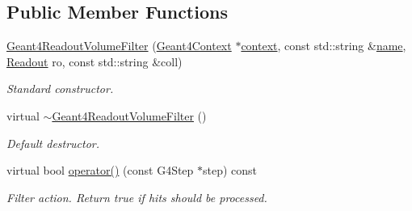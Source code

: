 \subsection*{Public Member Functions}
\begin{DoxyCompactItemize}
\item 
\hyperlink{class_d_d4hep_1_1_simulation_1_1_geant4_readout_volume_filter_a459197d17e4baedd3d1147e4def0aea9}{Geant4\+Readout\+Volume\+Filter} (\hyperlink{class_d_d4hep_1_1_simulation_1_1_geant4_context}{Geant4\+Context} $\ast$\hyperlink{class_d_d4hep_1_1_simulation_1_1_geant4_action_aa9d87f0ec2a72b7fc2591b18f98d75cf}{context}, const std\+::string \&\hyperlink{class_d_d4hep_1_1_simulation_1_1_geant4_action_af374e70b014d16afb81dd9d77cc3894b}{name}, \hyperlink{class_d_d4hep_1_1_simulation_1_1_geant4_readout_volume_filter_a30e6a3445a33de61e3c648149e285c46}{Readout} ro, const std\+::string \&coll)
\begin{DoxyCompactList}\small\item\em Standard constructor. \end{DoxyCompactList}\item 
virtual \hyperlink{class_d_d4hep_1_1_simulation_1_1_geant4_readout_volume_filter_a36b9e4aa16116e85f3635ac891c60972}{$\sim$\+Geant4\+Readout\+Volume\+Filter} ()
\begin{DoxyCompactList}\small\item\em Default destructor. \end{DoxyCompactList}\item 
virtual bool \hyperlink{class_d_d4hep_1_1_simulation_1_1_geant4_readout_volume_filter_a50031691fd40aa13e9fdcfe0203cd7f5}{operator()} (const G4\+Step $\ast$step) const
\begin{DoxyCompactList}\small\item\em Filter action. Return true if hits should be processed. \end{DoxyCompactList}\end{DoxyCompactItemize}
